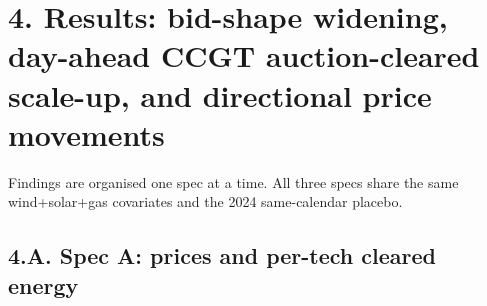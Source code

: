 \documentclass[11pt]{article}
\begin{document}
\vspace{10pt}

\section*{4. Results: bid-shape widening, day-ahead CCGT auction-cleared scale-up, and directional price movements}
\label{sec:results}

\noindent Findings are organised one spec at a time. All three specs share the same wind+solar+gas covariates and the 2024 same-calendar placebo.

\subsection*{4.A. Spec A: prices and per-tech cleared energy}
\label{sec:4-specA}
\end{document}
